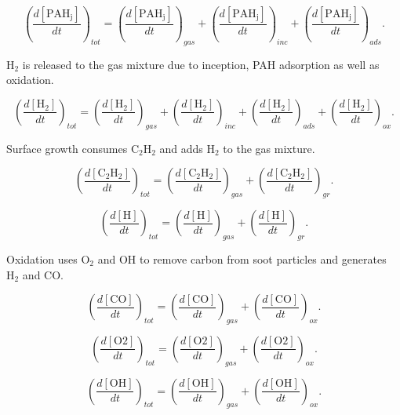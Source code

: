 \begin{equation}
	\left(
		\frac{d\left[{\mathrm{PAH_j}}\right]}{dt}
	\right)_{tot}
	= 
	\left(
		\frac{d\left[{\mathrm{PAH_j}}\right]}{dt}
	\right)_{gas}
	+
	\left(
		\frac{d\left[{\mathrm{PAH_j}}\right]}{dt}
	\right)_{inc}
	+
	\left(
		\frac{d\left[{\mathrm{PAH_j}}\right]}{dt}
	\right)_{ads}
	\label{eqn:PAHscrub_total}.
\end{equation}

$\mathrm{H_2}$ is released to the gas mixture due to inception, PAH adsorption as well as oxidation.

\begin{equation}
	\left(
	\frac{d\left[{\mathrm{H_2}}\right]}{dt}
	\right)_{tot}
	= 
	\left(
	\frac{d\left[{\mathrm{H_2}}\right]}{dt}
	\right)_{gas}
	+
	\left(
	\frac{d\left[{\mathrm{H_2}}\right]}{dt}
	\right)_{inc}
	+
	\left(
	\frac{d\left[{\mathrm{H_2}}\right]}{dt}
	\right)_{ads}
	+
	\left(
	\frac{d\left[{\mathrm{H_2}}\right]}{dt}
	\right)_{ox}
	\label{eqn:H2scrub_total}.
\end{equation}

Surface growth consumes $\mathrm{C_2H_2}$ and adds $\mathrm{H_2}$ to the gas mixture.

\begin{equation}
	\left(
	\frac{d\left[{\mathrm{C_2H_2}}\right]}{dt}
	\right)_{tot}
	= 
	\left(
	\frac{d\left[{\mathrm{C_2H_2}}\right]}{dt}
	\right)_{gas}
	+
	\left(
	\frac{d\left[{\mathrm{C_2H_2}}\right]}{dt}
	\right)_{gr}
	\label{eqn:C2H2scrub_total}.
\end{equation}


\begin{equation}
	\left(
	\frac{d\left[{\mathrm{H}}\right]}{dt}
	\right)_{tot}
	= 
	\left(
	\frac{d\left[{\mathrm{H}}\right]}{dt}
	\right)_{gas}
	+
	\left(
	\frac{d\left[{\mathrm{H}}\right]}{dt}
	\right)_{gr}
	\label{eqn:Hscrub_total}.
\end{equation}

Oxidation uses $\mathrm{O_2}$ and $\mathrm{OH}$ to remove carbon from soot particles and generates $\mathrm{H_2}$ and $\mathrm{CO}$.

\begin{equation}
	\left(
		\frac{
			d\left[
				\mathrm{CO}
			\right]
		}{dt}
	\right)_{tot}
	= 
	\left(
	\frac{d\left[{\mathrm{CO}}\right]}{dt}
	\right)_{gas}
	+
	\left(
	\frac{d\left[{\mathrm{CO}}\right]}{dt}
	\right)_{ox}
	\label{eqn:COscrub_total}.
\end{equation}

\begin{equation}
	\left(
	\frac{
		d\left[
		\mathrm{O2}
		\right]
	}{dt}
	\right)_{tot}
	= 
	\left(
	\frac{d\left[{\mathrm{O2}}\right]}{dt}
	\right)_{gas}
	+
	\left(
	\frac{d\left[{\mathrm{O2}}\right]}{dt}
	\right)_{ox}
	\label{eqn:O2scrub_total}.
\end{equation}

\begin{equation}
	\left(
	\frac{
		d\left[
		\mathrm{OH}
		\right]
	}{dt}
	\right)_{tot}
	= 
	\left(
	\frac{d\left[{\mathrm{OH}}\right]}{dt}
	\right)_{gas}
	+
	\left(
	\frac{d\left[{\mathrm{OH}}\right]}{dt}
	\right)_{ox}
	\label{eqn:OHscrub_total}.
\end{equation}




